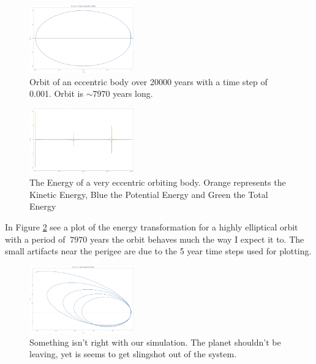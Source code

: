\documentclass{article}
\begin{document}
\pagebreak
\bigskip
{}
\medskip

\begin{figure}[h]
	\begin{center}
		\includegraphics[width=0.4\textwidth]{veo3.pdf}
	\end{center}
	\caption{Orbit of an eccentric body over 20000 years with a time step of 0.001. Orbit is $\sim7970$ years long.}
	\label{fig:vee}
\end{figure}


\begin{figure}[h]
	\begin{center}
		\includegraphics[width=0.4\textwidth]{veccenergy.pdf}
	\end{center}
	\caption{The Energy of a very eccentric orbiting body. Orange represents the Kinetic Energy, Blue the Potential Energy and Green the Total Energy}
	\label{fig:vee}
\end{figure}

In Figure \ref{fig:vee} see a plot of the energy transformation for a highly elliptical orbit with a period of $ ~7970 $ years the orbit behaves much the way I expect it to. The small artifacts near the perigee are due to the 5 year time steps used for plotting.

\pagebreak
\bigskip
{}
\medskip

\begin{figure}[h]
	\begin{center}
		\includegraphics[width=0.4\textwidth]{veo.pdf}
	\end{center}
	\caption{Something isn't right with our simulation. The planet shouldn't be leaving, yet is seems to get slingshot out of the system.}
	\label{fig:veo}
\end{figure}
\end{document}
